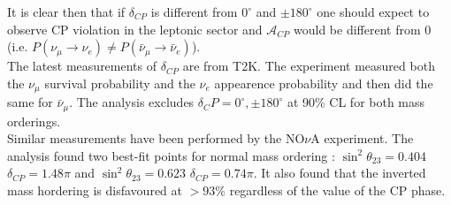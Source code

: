 \documentclass[12pt,a4paper,openright,twoside]{report}
\begin{document}
It is clear then that if $\delta_{CP}$ is different from $0^\circ$ and $\pm 180 ^\circ$ one should expect to observe CP violation in the leptonic sector and $\mathcal{A}_{CP}$ would be different from 0 (i.e. $P(\nu_\mu \rightarrow \nu_e) \neq P(\bar{\nu}_\mu \rightarrow \bar{\nu}_e)$).\\
The latest measurements of $\delta_{CP}$ are from T2K. The experiment measured both the $\nu_\mu$ survival probability and the $\nu_e$ appearence probability and then did the same for $\bar{\nu}_\mu$. The analysis excludes $\delta_CP=0^\circ,\pm 180 ^\circ$ at 90\% CL for both mass orderings.\\
Similar measurements have been performed by the NO$\nu$A experiment. The analysis found two best-fit points for normal mass ordering : $\sin^2\theta_{23}= 0.404$ $\delta_{CP}=1.48\pi$ and $\sin^2\theta_{23}= 0.623$ $\delta_{CP}=0.74\pi$. It also found that the inverted mass hordering is disfavoured at $>93\%$ regardless of the value of the CP phase.
\end{document}

